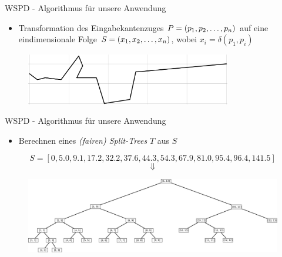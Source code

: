 \documentclass{beamer}
\begin{document}
	\begin{frame}{WSPD - Algorithmus für unsere Anwendung}
		\begin{itemize}
			\item Transformation des Eingabekantenzuges $P = (p_1, p_2, \mathellipsis, p_n)$ auf eine eindimensionale Folge $S = (x_1, x_2, \mathellipsis, x_n)$, wobei $x_i = \delta(p_1, p_i)$
		\end{itemize}
		\begin{figure}
			\centering
			\includegraphics[width=0.8\textwidth]{raw_path_cropped.png}
		\end{figure}
	\end{frame}
	
	\begin{frame}{WSPD - Algorithmus für unsere Anwendung}
		\begin{itemize}
			\item Berechnen eines \emph{(fairen) Split-Trees} $T$ aus $S$
		\end{itemize}
		\[S = [0, 5.0, 9.1, 17.2, 32.2, 37.6, 44.3, 54.3, 67.9, 81.0, 95.4, 96.4, 141.5]\]
		\[\Downarrow\]
		\begin{figure}
			\centering
			\includegraphics[width=\textwidth]{split_tree.png}
		\end{figure}
	\end{frame}
	
\end{document}
